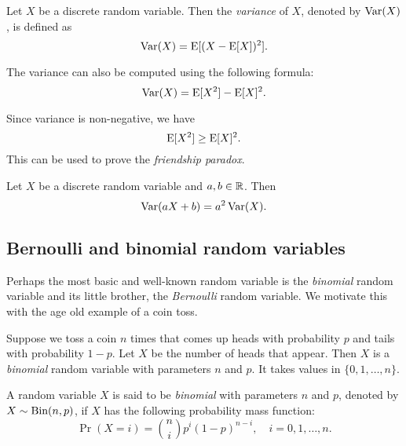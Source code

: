 \documentclass{article}
\begin{document}
\begin{definition}
  Let $X$ be a discrete random variable.
  Then the \emph{variance} of $X$, denoted by $\operatorname{Var}(X)$, is defined as
  \[
    \operatorname{Var}(X) = \operatorname{E}[(X - \operatorname{E}[X])^2].
  \]
\end{definition}

\begin{remark}
  The variance can also be computed using the following formula:
  \[
    \operatorname{Var}(X) = \operatorname{E}[X^2] - \operatorname{E}[X]^2.
  \]
\end{remark}

\begin{remark}
  Since variance is non-negative, we have
  \[
    \operatorname{E}[X^2] \geq \operatorname{E}[X]^2.
  \]
  This can be used to prove the \emph{friendship paradox}.
\end{remark}

\begin{proposition}
  Let $X$ be a discrete random variable and $a, b \in \mathbb{R}$.
  Then
  \[
    \operatorname{Var}(a X + b) = a^2 \operatorname{Var}(X).
  \]
\end{proposition}

\subsection{Bernoulli and binomial random variables}

Perhaps the most basic and well-known random variable is the \emph{binomial} random variable and its little brother, the \emph{Bernoulli} random variable.
We motivate this with the age old example of a coin toss.

\begin{example}
  Suppose we toss a coin $n$ times that comes up heads with probability $p$ and tails with probability $1 - p$.
  Let $X$ be the number of heads that appear.
  Then $X$ is a \emph{binomial} random variable with parameters $n$ and $p$.
  It takes values in $\{0, 1, \ldots, n\}$.
\end{example}

\begin{definition}
  A random variable $X$ is said to be \emph{binomial} with parameters $n$ and $p$, denoted by $X \sim \textnormal{Bin}(n, p)$, if $X$ has the following probability mass function:
  \[
    \Pr(X = i) = \binom{n}{i} p^i (1 - p)^{n - i}, \quad i = 0, 1, \ldots, n.
  \]
\end{definition}
\end{document}
